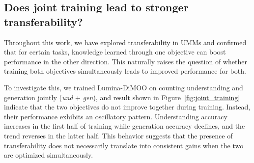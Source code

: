 \subsection{Does joint training lead to stronger transferability?}
\label{sec:joint_training}




Throughout this work, we have explored transferability in UMMs and confirmed that for certain tasks, knowledge learned through one objective can boost performance in the other direction. This naturally raises the question of whether training both objectives simultaneously leads to improved performance for both.

To investigate this, we trained Lumina-DiMOO on counting understanding and generation jointly (\textit{und} + \textit{gen}), and result shown in Figure~\ref{fig:joint_training} indicate that the two objectives do not improve together during training. Instead, their performance exhibits an oscillatory pattern. Understanding accuracy increases in the first half of training while generation accuracy declines, and the trend reverses in the latter half. This behavior suggests that the presence of transferability does not necessarily translate into consistent gains when the two are optimized simultaneously.


